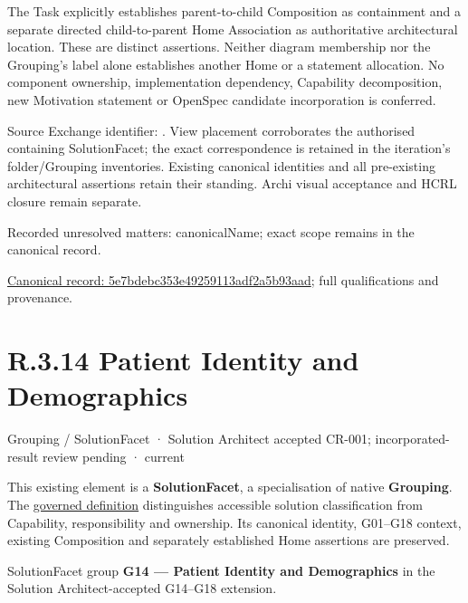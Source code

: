 The Task explicitly establishes parent-to-child Composition as containment and
a separate directed child-to-parent Home Association as authoritative architectural
location. These are distinct assertions. Neither diagram membership nor the
Grouping's label alone establishes another Home or a statement allocation.
No component ownership, implementation dependency, Capability decomposition,
new Motivation statement or OpenSpec candidate incorporation is conferred.



Source Exchange identifier: \texttt{}. View placement corroborates
the authorised containing SolutionFacet; the exact correspondence is retained in the
iteration's folder/Grouping inventories. Existing canonical identities and all
pre-existing architectural assertions retain their standing. Archi visual
acceptance and HCRL closure remain separate.


{\small Recorded unresolved matters: canonicalName; exact scope remains in the canonical record.}\par
{\footnotesize \href{../../../../../../../continuum/grouping/5e7bdebc353e49259113adf2a5b93aad.md}{Canonical record: 5e7bdebc353e49259113adf2a5b93aad}; full qualifications and provenance.}\par
\section*{R.3.14 Patient Identity and Demographics}
\label{navigation:R.3.14}

\label{element:a9deca9adbb443208d6f08dbe4505717}
{\small Grouping / SolutionFacet · Solution Architect accepted CR-001; incorporated-result review pending · current}\par

This existing element is a \textbf{SolutionFacet}, a specialisation of native
\textbf{Grouping}. The \href{\detokenize{../../../../../../../governance/continuum-representation.md#solutionfacet-classification--1119-candidate}}{governed definition}
distinguishes accessible solution classification from Capability, responsibility
and ownership. Its canonical identity, G01–G18 context, existing Composition
and separately established Home assertions are preserved.



SolutionFacet group \textbf{G14 — Patient Identity and Demographics} in the Solution Architect-accepted G14–G18 extension.



